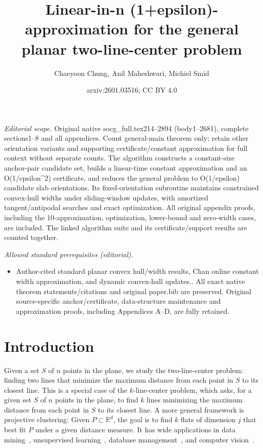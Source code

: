 \documentclass[10pt,a4paper]{article}
\title{Linear-in-n (1+epsilon)-approximation for the general planar two-line-center problem}
\author{Chaeyoon Chung, Anil Maheshwari, Michiel Smid}
\date{arxiv:2601.03516; CC BY 4.0}
\theoremstyle{star}
\theoremstyle{claimstar}
\begin{document}
\maketitle
\noindent\textit{Editorial scope.} Original native socg\_full.tex214–2894 (body1–2681), complete sections1–8 and all appendices. Count general-main theorem only; retain other orientation variants and supporting certificate/constant approximation for full context without separate counts. The algorithm constructs a constant-size anchor-pair candidate set, builds a linear-time constant approximation and an O(1/epsilon\textasciicircum{}2) certificate, and reduces the general problem to O(1/epsilon) candidate slab orientations. Its fixed-orientation subroutine maintains constrained convex-hull widths under sliding-window updates, with amortized tangent/antipodal searches and exact optimization. All original appendix proofs, including the 10-approximation, optimization, lower-bound and zero-width cases, are included. The linked algorithm suite and its certificate/support results are counted together.\par\medskip
\noindent\textit{Allowed standard prerequisites (editorial).}\begin{itemize}
\item Author-cited standard planar convex hull/width results, Chan online constant width approximation, and dynamic convex-hull updates.. All exact native theorem statements/citations and original paper.bib are preserved. Original source-specific anchor/certificate, data-structure maintenance and approximation proofs, including Appendices A–D, are fully retained.
\end{itemize}\medskip
\section{Introduction}


Given a set $S$ of $n$ points in the plane, we study the two-line-center problem: finding two lines that minimize the maximum distance from each point in $S$ to its closest line.  
This is a special case of the $k$-line-center problem, which asks, for a given set $S$ of $n$ points in the plane, to find $k$ lines minimizing the maximum distance from each point in $S$ to its closest line.  
A more general framework is projective clustering: Given $P\subset \mathbb R^d$, the goal is to find $k$ flats of dimension $j$ that best fit $P$ under a given distance measure. 
It has wide applications in data mining~\cite{datamining1999, datamining2000}, unsupervised learning~\cite{Procopiuc2010unsupervised}, database management~\cite{Chakrabarti2000db}, and computer vision~\cite{Procopiuc2002cv}.  
\end{document}
